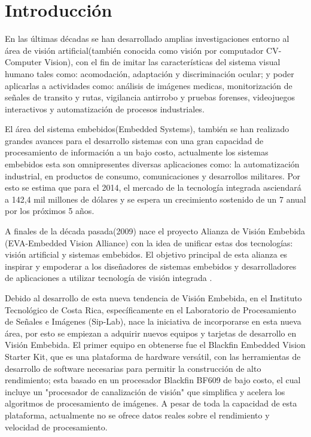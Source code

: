 
\chapter{Introducción}
\label{chp:intro}

En las últimas décadas se han desarrollado amplias investigaciones entorno al área de visión artificial(también conocida como visión por computador CV-Computer Vision)\cite{opencv2014}, con el fin de imitar las características del sistema visual humano tales como: acomodación, adaptación y discriminación ocular; y poder aplicarlas a actividades como: análisis de imágenes medicas, monitorización de señales de transito y rutas, vigilancia antirrobo y pruebas forenses, videojuegos interactivos y automatización de procesos industriales. 

El área del sistema embebidos(Embedded Systems), también se han realizado grandes avances para el desarrollo sistemas con una gran capacidad de procesamiento de información a un bajo costo, actualmente los sistemas embebidos esta son omnipresentes diversas aplicaciones como: la automatización industrial, en productos de consumo, comunicaciones y desarrollos militares. Por esto se estima que para el 2014, el mercado de la tecnología integrada asciendará a 142,4 mil millones de dólares y se espera un crecimiento sostenido de un 7 anual por los próximos 5 años\cite{market2014}.



A finales de la década pasada(2009) nace el proyecto Alianza de Visión Embebida (EVA-Embedded Vision Alliance) con la idea de unificar estas dos tecnologías: visión artificial y sistemas embebidos. El objetivo principal de esta alianza es inspirar y empoderar a los diseñadores de sistemas embebidos y desarrolladores de aplicaciones a utilizar tecnología de visión integrada \cite{alliance2014}. 

Debido al desarrollo de esta nueva tendencia de Visión Embebida, en el Instituto Tecnológico de Costa Rica, específicamente en el Laboratorio de Procesamiento de Señales e Imágenes (Sip-Lab), nace la iniciativa de incorporarse en esta nueva área, por esto se empiezan a adquirir nuevos equipos y tarjetas de desarrollo en Visión Embebida. El primer equipo en obtenerse fue el Blackfin Embedded Vision Starter Kit, que es una plataforma de hardware versátil, con las herramientas de desarrollo de software necesarias para permitir la construcción de alto rendimiento; esta basado en un procesador Blackfin BF609 de bajo costo, el cual incluye un "procesador de canalización de visión" que simplifica y acelera los algoritmos de procesamiento de imágenes\cite{finboard}. A pesar de toda la capacidad de esta plataforma, actualmente no se ofrece datos reales sobre el rendimiento y velocidad de procesamiento.

